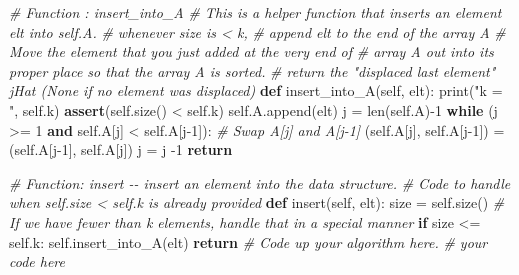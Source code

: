 \documentclass[
]{article}
\newenvironment{Shaded}{}{}
\newcommand{\BuiltInTok}[1]{\textcolor[rgb]{0.00,0.50,0.00}{#1}}
\newcommand{\CommentTok}[1]{\textcolor[rgb]{0.38,0.63,0.69}{\textit{#1}}}
\newcommand{\ControlFlowTok}[1]{\textcolor[rgb]{0.00,0.44,0.13}{\textbf{#1}}}
\newcommand{\DecValTok}[1]{\textcolor[rgb]{0.25,0.63,0.44}{#1}}
\newcommand{\KeywordTok}[1]{\textcolor[rgb]{0.00,0.44,0.13}{\textbf{#1}}}
\newcommand{\NormalTok}[1]{#1}
\newcommand{\OperatorTok}[1]{\textcolor[rgb]{0.40,0.40,0.40}{#1}}
\newcommand{\StringTok}[1]{\textcolor[rgb]{0.25,0.44,0.63}{#1}}
\newcommand{\VariableTok}[1]{\textcolor[rgb]{0.10,0.09,0.49}{#1}}
\begin{document}
\begin{Shaded}
\begin{Highlighting}[]
    \CommentTok{\# Function : insert\_into\_A}
    \CommentTok{\# This is a helper function that inserts an element \textasciigrave{}elt\textasciigrave{} into \textasciigrave{}self.A\textasciigrave{}.}
    \CommentTok{\# whenever size is \textless{} k,}
    \CommentTok{\#       append elt to the end of the array A}
    \CommentTok{\# Move the element that you just added at the very end of}
    \CommentTok{\# array A out into its proper place so that the array A is sorted.}
    \CommentTok{\# return the "displaced last element" jHat (None if no element was displaced)}
    \KeywordTok{def}\NormalTok{ insert\_into\_A(}\VariableTok{self}\NormalTok{, elt):}
        \BuiltInTok{print}\NormalTok{(}\StringTok{"k = "}\NormalTok{, }\VariableTok{self}\NormalTok{.k)}
        \ControlFlowTok{assert}\NormalTok{(}\VariableTok{self}\NormalTok{.size() }\OperatorTok{\textless{}} \VariableTok{self}\NormalTok{.k)}
        \VariableTok{self}\NormalTok{.A.append(elt)}
\NormalTok{        j }\OperatorTok{=} \BuiltInTok{len}\NormalTok{(}\VariableTok{self}\NormalTok{.A)}\OperatorTok{{-}}\DecValTok{1}
        \ControlFlowTok{while}\NormalTok{ (j }\OperatorTok{\textgreater{}=} \DecValTok{1} \KeywordTok{and} \VariableTok{self}\NormalTok{.A[j] }\OperatorTok{\textless{}} \VariableTok{self}\NormalTok{.A[j}\OperatorTok{{-}}\DecValTok{1}\NormalTok{]):}
            \CommentTok{\# Swap A[j] and A[j{-}1]}
\NormalTok{            (}\VariableTok{self}\NormalTok{.A[j], }\VariableTok{self}\NormalTok{.A[j}\OperatorTok{{-}}\DecValTok{1}\NormalTok{]) }\OperatorTok{=}\NormalTok{ (}\VariableTok{self}\NormalTok{.A[j}\OperatorTok{{-}}\DecValTok{1}\NormalTok{], }\VariableTok{self}\NormalTok{.A[j])}
\NormalTok{            j }\OperatorTok{=}\NormalTok{ j }\OperatorTok{{-}}\DecValTok{1}
        \ControlFlowTok{return}


    \CommentTok{\# Function: insert {-}{-} insert an element into the data structure.}
    \CommentTok{\# Code to handle when self.size \textless{} self.k is already provided}
    \KeywordTok{def}\NormalTok{ insert(}\VariableTok{self}\NormalTok{, elt):}
\NormalTok{        size }\OperatorTok{=} \VariableTok{self}\NormalTok{.size()}
        \CommentTok{\# If we have fewer than k elements, handle that in a special manner}
        \ControlFlowTok{if}\NormalTok{ size }\OperatorTok{\textless{}=} \VariableTok{self}\NormalTok{.k:}
            \VariableTok{self}\NormalTok{.insert\_into\_A(elt)}
            \ControlFlowTok{return}
        \CommentTok{\# Code up your algorithm here.}
        \CommentTok{\# your code here}


\end{Highlighting}
\end{Shaded}
\end{document}
